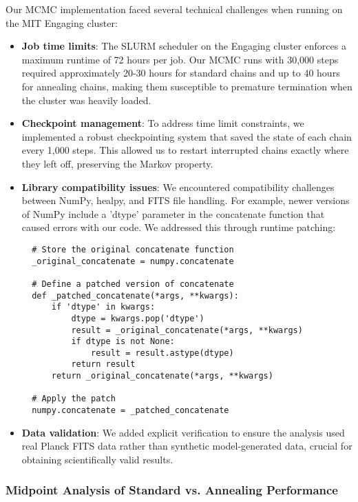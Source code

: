 \documentclass[11pt]{article}
\theoremstyle{definition}
\begin{document}
Our MCMC implementation faced several technical challenges when running on the MIT Engaging cluster:

\begin{itemize}
  \item \textbf{Job time limits}: The SLURM scheduler on the Engaging cluster enforces a maximum runtime of 72 hours per job. Our MCMC runs with 30,000 steps required approximately 20-30 hours for standard chains and up to 40 hours for annealing chains, making them susceptible to premature termination when the cluster was heavily loaded.
  
  \item \textbf{Checkpoint management}: To address time limit constraints, we implemented a robust checkpointing system that saved the state of each chain every 1,000 steps. This allowed us to restart interrupted chains exactly where they left off, preserving the Markov property.
  
  \item \textbf{Library compatibility issues}: We encountered compatibility challenges between NumPy, healpy, and FITS file handling. For example, newer versions of NumPy include a 'dtype' parameter in the concatenate function that caused errors with our code. We addressed this through runtime patching:
  
  \begin{verbatim}
  # Store the original concatenate function
  _original_concatenate = numpy.concatenate
  
  # Define a patched version of concatenate
  def _patched_concatenate(*args, **kwargs):
      if 'dtype' in kwargs:
          dtype = kwargs.pop('dtype')
          result = _original_concatenate(*args, **kwargs)
          if dtype is not None:
              result = result.astype(dtype)
          return result
      return _original_concatenate(*args, **kwargs)
  
  # Apply the patch
  numpy.concatenate = _patched_concatenate
  \end{verbatim}
  
  \item \textbf{Data validation}: We added explicit verification to ensure the analysis used real Planck FITS data rather than synthetic model-generated data, crucial for obtaining scientifically valid results.
\end{itemize}

\subsubsection{Midpoint Analysis of Standard vs. Annealing Performance}
\end{document}
